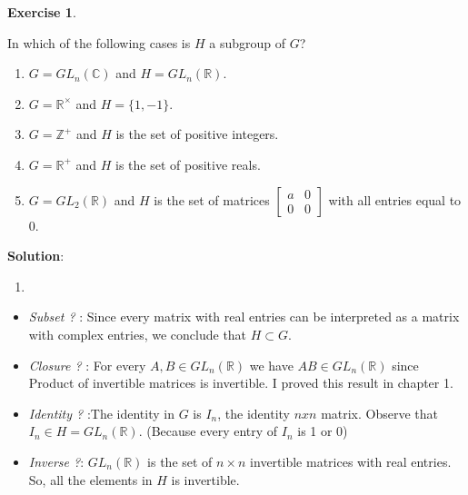 \documentclass[
]{book}
\providecommand{\tightlist}{%
  \setlength{\itemsep}{0pt}\setlength{\parskip}{0pt}}
\theoremstyle{definition}
\theoremstyle{definition}
\theoremstyle{definition}
\newtheorem{exercise}{Exercise}[chapter]
\theoremstyle{definition}
\theoremstyle{remark}
\begin{document}
\begin{exercise}
\protect\hypertarget{exr:unnamed-chunk-65}{}\label{exr:unnamed-chunk-65}

In which of the following cases is \(H\) a subgroup of \(G\)?

\begin{enumerate}
\def\labelenumi{(\alph{enumi})}
\item
  \(G = GL_n(\mathbb{C})\) and \(H = GL_n(\mathbb{R})\).
\item
  \(G = \mathbb{R}^\times\) and \(H = \{1, -1\}\).
\item
  \(G = \mathbb{Z}^+\) and \(H\) is the set of positive integers.
\item
  \(G = \mathbb{R}^+\) and \(H\) is the set of positive reals.
\item
  \(G = GL_2(\mathbb{R})\) and \(H\) is the set of matrices \(\begin{bmatrix} a & 0 \\ 0 & 0 \end{bmatrix}\) with all entries equal to 0.
\end{enumerate}

\end{exercise}

\textbf{Solution}:\\

\begin{enumerate}
\def\labelenumi{(\alph{enumi})}
\tightlist
\item
\end{enumerate}

\begin{itemize}
\item
  \emph{Subset ?} : Since every matrix with real entries can be interpreted as a matrix with complex entries, we conclude that \(H \subset G\).
\item
  \emph{Closure ?} : For every \(A, B \in GL_n(\mathbb{R})\) we have \(AB \in GL_n(\mathbb{R})\) since Product of invertible matrices is invertible. I proved this result in chapter 1.
\item
  \emph{Identity ?} :The identity in \(G\) is \(I_n\), the identity \(n x n\) matrix. Observe that \(I_n\in H=GL_n(\mathbb{R})\). (Because every entry of \(I_n\) is 1 or 0)
\item
  \emph{Inverse ?}: \(GL_n(\mathbb{R})\) is the set of \(n \times n\) invertible matrices with real entries. So, all the elements in \(H\) is invertible.
\end{itemize}
\end{document}

